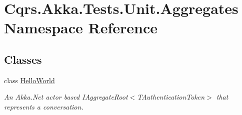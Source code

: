 \hypertarget{namespaceCqrs_1_1Akka_1_1Tests_1_1Unit_1_1Aggregates}{}\section{Cqrs.\+Akka.\+Tests.\+Unit.\+Aggregates Namespace Reference}
\label{namespaceCqrs_1_1Akka_1_1Tests_1_1Unit_1_1Aggregates}
\subsection*{Classes}
\begin{DoxyCompactItemize}
\item 
class \hyperlink{classCqrs_1_1Akka_1_1Tests_1_1Unit_1_1Aggregates_1_1HelloWorld}{Hello\+World}
\begin{DoxyCompactList}\small\item\em An Akka.\+Net actor based I\+Aggregate\+Root$<$\+T\+Authentication\+Token$>$ that represents a conversation. \end{DoxyCompactList}\end{DoxyCompactItemize}
